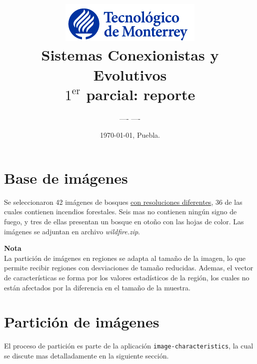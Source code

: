 \documentclass{article}
\title{ \includegraphics[scale=0.6, right]{itesm_logo}
	    \\[4em] 
        Sistemas Conexionistas y Evolutivos
        \\[2em]
        $1^\text{er}$ parcial: reporte %
        \\[1em]
        }
\author{ \vspace*{\fill} ---- \qquad\small ---- \\[1em] }
\date{ \vspace*{\fill} \today, Puebla.}
\newenvironment{note}
    {\begin{mdframed}[leftmargin=1cm, 
                 skipabove=1em,
                 skipbelow=1em,
                 rightline=false, 
                 topline=false,
                 bottomline=false,
                 linewidth=2pt]
        \textbf{Nota}\\}
    {\end{mdframed}}
\begin{document}

\maketitle
\newpage

\def\ImgCharRoot{run:./docs/image-characteristics}
\def\ImgCharacteristics{\ImgCharRoot/ImgCharacteristics.html}
\def\Friday{\ImgCharRoot/ImgCharacteristics-Friday.html}
\def\Extractors{\ImgCharRoot/ImgCharacteristics-Friday-Extractors.html}
\def\ExtractorBuilder{\ImgCharRoot/ImgCharacteristics-ExtractorBuilder.html}
\def\GTK{\ImgCharRoot/ImgCharacteristics-GTK.html}
\def\Weka{\ImgCharRoot/ImgCharacteristics-Weka.html}

\def\ExecAll{run:./docs/image-characteristics/img-chv_descriptive-stats_all/src/Main.html}

\def\Nat{run:./docs/Nat/frames.html}
\def\WekaData{run:./docs/WekaData/frames.html}

\def\WekaANN{run:./docs/WekaANN/index.html}

\section{Base de imágenes}

Se seleccionaron 42 imágenes de bosques \underline{con resoluciones diferentes}, 36 de las cuales contienen incendios forestales. Seis mas no contienen ningún signo de fuego, y tres de ellas presentan un bosque en otoño con las hojas de color. Las imágenes se adjuntan en archivo \textit{wildfire.zip}.

\begin{note}
La partición de imágenes en regiones se adapta al tamaño de la imagen, lo que permite recibir regiones con desviaciones de tamaño reducidas. Ademas, el vector de características se forma por los valores estadísticos de la región, los cuales no están afectados por la diferencia en el tamaño de la muestra.
\end{note}


\section{Partición de imágenes}

El proceso de partición es parte de la aplicación \verb|image-characteristics|, la cual se discute mas detalladamente en la siguiente sección.
\end{document}
